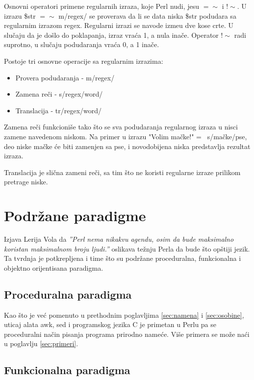 \documentclass[a4paper]{article}
\begin{document}
Osnovni operatori primene regularnih izraza, koje Perl nudi, jesu $=\sim$ i $!\sim$. U izrazu \$str $=\sim$ m/regex/ se proverava da li se data niska \$str podudara sa regularnim izrazom regex. Regularni izrazi se navode izme\dj{}u dve kose crte. U slučaju da je došlo do poklapanja, izraz vraća 1, a nula inače. Operator $!\sim$ radi suprotno, u slučaju podudaranja vraća 0, a 1 inače.

Postoje tri osnovne operacije sa regularnim izrazima:

\begin{itemize}
  \item Provera podudaranja - m/regex/
  \item Zamena re\v ci - s/regex/word/
  \item Translacija - tr/regex/word/
\end{itemize}

Zamena reči funkcioniše tako što se sva podudaranja regularnog izraza u nisci zamene navedenom niskom. Na primer u izrazu "Volim mačke!" =~ s/mačke/pse, deo niske mačke \' ce biti zamenjen sa pse, i novodobijena niska predstavlja rezultat izraza.

Translacija je slična zameni reči, sa tim što ne koristi regularne izraze prilikom pretrage niske.


\section{Podržane paradigme}

Izjava Lerija Vola da \emph{''Perl nema nikakvu agendu, osim da bude maksimalno koristan maksimalnom broju ljudi.''}\cite{wallperl} oslikava težnju Perla da bude što opštiji jezik. Ta tvrdnja je potkrepljena i time što su podržane proceduralna, funkcionalna i objektno orijentisana paradigma. 

\subsection{Proceduralna paradigma}
Kao što je već pomenuto u prethodnim poglavljima \ref{sec:namena} i \ref{sec:osobine}, uticaj alata awk, sed i programskog jezika C je primetan u Perlu pa se proceduralni način pisanja programa prirodno nameće. Više primera se može naći u poglavlju \ref{sec:primeri}.

\subsection{Funkcionalna paradigma}
\end{document}
